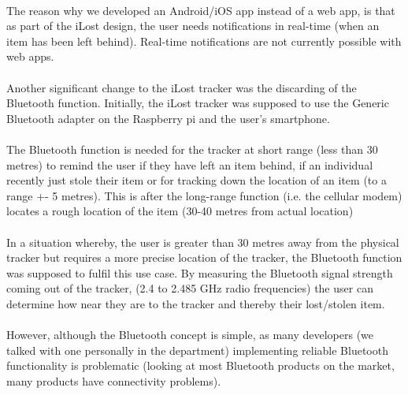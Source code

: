 \documentclass[12pt,a4paper]{article}
\begin{document}
        \paragraph{} The reason why we developed an Android/iOS app instead of a web app, is that as part of the iLost design, the user needs notifications in real-time (when an item has been left behind). Real-time notifications are not currently possible with web apps.
        
        \paragraph{} Another significant change to the iLost tracker was the discarding of the Bluetooth function. Initially, the iLost tracker was supposed to use the Generic Bluetooth adapter on the Raspberry pi and the user’s smartphone.  
        
        \paragraph{} The Bluetooth function is needed for the tracker at short range (less than 30 metres) to remind the user if they have left an item behind, if an individual recently just stole their item or for tracking down the location of an item (to a range +- 5 metres). This is after the long-range function (i.e. the cellular modem) locates a rough location of the item (30-40 metres from actual location)
        
        \paragraph{} In a situation whereby, the user is greater than 30 metres away from the physical tracker but requires a more precise location of the tracker, the Bluetooth function was supposed to fulfil this use case. By measuring the Bluetooth signal strength coming out of the tracker, (2.4 to 2.485 GHz radio frequencies) the user can determine how near they are to the tracker and thereby their lost/stolen item. 
        
        \paragraph{} However, although the Bluetooth concept is simple, as many developers (we talked with one personally in the department) implementing reliable Bluetooth functionality is problematic (looking at most Bluetooth products on the market, many products have connectivity problems).  
        
\end{document}
